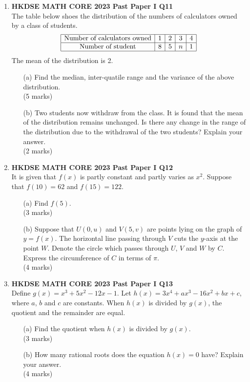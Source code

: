 \documentclass[12pt]{article}
\begin{document}
\begin{enumerate}
	\item \textbf{HKDSE MATH CORE 2023 Past Paper I Q11}\\
	The table below shoes the distribution of the numbers of calculators owned by a class of students.
	$$\begin{array}{|c|c|c|c|c|}
		\hline
		\text{Number of calculators owned} & 1 & 2 & 3 & 4 \\
		\hline
		\text{Number of student} & 8 & 5 & n & 1 \\
		\hline
	\end{array}$$
	The mean of the distribution is 2.
	\begin{enumerate}
		\item[(a)] Find the median, inter-quatile range and the variance of the above distribution. \\(5 marks)
		\item[(b)] Two students now withdraw from the class. It is found that the mean of the distribution remains unchanged. Is there any change in the range of the distribution due to the withdrawal of the two students? Explain your answer. \\(2 marks)
	\end{enumerate}

	\item \textbf{HKDSE MATH CORE 2023 Past Paper I Q12}\\
	It is given that $f(x)$ is partly constant and partly varies as $x^2$. Suppose that $f(10) = 62$ and $f(15) = 122$.
	\begin{enumerate}
		\item[(a)] Find $f(5)$. \\(3 marks)
		\item[(b)] Suppose that $U(0, u)$ and $V(5,v)$ are points lying on the graph of $y = f(x)$. The horizontal line passing through $V$ cuts the $y$-axis at the point $W$. Denote the circle which passes through $U$, $V$ and $W$ by $C$. Express the circumference of $C$ in terms of $\pi$. \\(4 marks)
	\end{enumerate}

	\item \textbf{HKDSE MATH CORE 2023 Past Paper I Q13}\\
	Define $g(x) = x^3 + 5x^2 - 12x - 1$. Let $h(x) = 3x^4 + ax^3 - 16x^2 + bx + c$, where $a$, $b$ and $c$ are constants. When $h(x)$ is divided by $g(x)$, the quotient and the remainder are equal.
	\begin{enumerate}
		\item[(a)] Find the quotient when $h(x)$ is divided by $g(x)$. \\(3 marks)
		\item[(b)] How many rational roots does the equation $h(x) = 0$ have? Explain your answer. \\(4 marks)
	\end{enumerate}


\end{enumerate}
\end{document}
